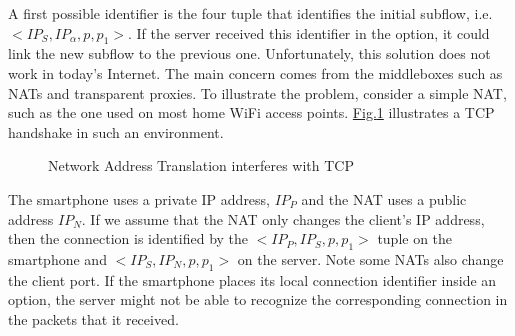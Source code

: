 \documentclass[letterpaper,10pt,english]{sphinxmanual}
\begin{document}
\sphinxAtStartPar
A first possible identifier is the four tuple that identifies the initial subflow, i.e. \(<IP_{S},IP_{\alpha},p,p_{1}>\). If the server received this identifier in the  option, it could link the new subflow to the previous one. Unfortunately, this solution does not work in today’s Internet. The main concern comes from the middleboxes such as NATs and transparent proxies. To illustrate the problem, consider a simple NAT, such as the one used on most home Wi\sphinxhyphen{}Fi access points. \hyperref[\detokenize{mptcp:fig-nat-interference}]{Fig.\@ \ref{\detokenize{mptcp:fig-nat-interference}}} illustrates a TCP handshake in such an environment.
\begin{figure}[htbp]\centering\capstart{}\caption{Network Address Translation interferes with TCP}\label{\detokenize{mptcp:id55}}\label{\detokenize{mptcp:fig-nat-interference}}\end{figure}
\sphinxAtStartPar
The smartphone uses a private IP address, \(IP_{P}\) and the NAT uses a public address \(IP_{N}\). If we assume that the NAT only changes the client’s IP address, then the connection is identified by the \(<IP_{P},IP_{S},p,p_{1}>\) tuple on the smartphone and \(<IP_{S},IP_{N},p,p_{1}>\) on the server. Note some NATs also change the client port. If the smartphone places its local connection identifier inside an  option, the server might not be able to recognize the corresponding connection in the  packets that it received.
\end{document}
